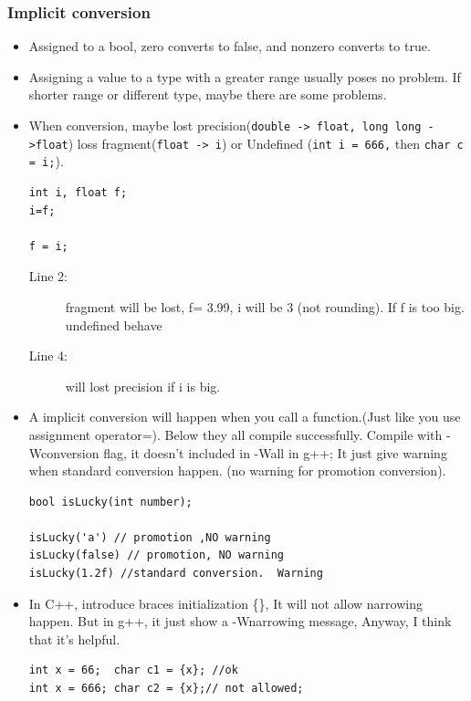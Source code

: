 \documentclass[a4paper,11pt,twoside]{book}
\begin{document}
\subsubsection{Implicit conversion}

\begin{itemize}
	\item Assigned to a bool, zero converts to false, and nonzero converts to true.
	
	\item Assigning a value to a type with a greater range usually poses no problem. If shorter range or different type, maybe there are some problems.
	
	\item When conversion, maybe lost precision(\texttt{double -> float, long long ->float}) loss fragment(\texttt{float -> i}) or Undefined (\texttt{int i = 666,} then \texttt{char c = i;}).
	
\begin{lstlisting}
int i, float f;
i=f;

f = i;
\end{lstlisting}
\begin{description}
	\item[Line 2:] fragment will be lost,  f= 3.99, i will be 3 (not rounding). If f is too big.  undefined behave
	\item[Line 4:] will lost precision if i is big.
\end{description}

	\item A implicit conversion will happen when you call a function.(Just like you use assignment operator=). Below they all compile successfully. Compile with -Wconversion flag, it doesn't included in -Wall in g++; It just give warning when standard conversion happen. (no warning for promotion conversion).
\begin{lstlisting}[numbers=none]
bool isLucky(int number);
	
isLucky('a') // promotion ,NO warning
isLucky(false) // promotion, NO warning
isLucky(1.2f) //standard conversion.  Warning
\end{lstlisting}

	\item In C++, introduce braces initialization \{\}, It will not allow narrowing happen. But in g++, it just show a -Wnarrowing message, Anyway, I think that it's helpful.
\begin{lstlisting}[numbers=none]
int x = 66;  char c1 = {x}; //ok	
int x = 666; char c2 = {x};// not allowed;
	

\end{lstlisting}
\end{itemize}
\end{document}
